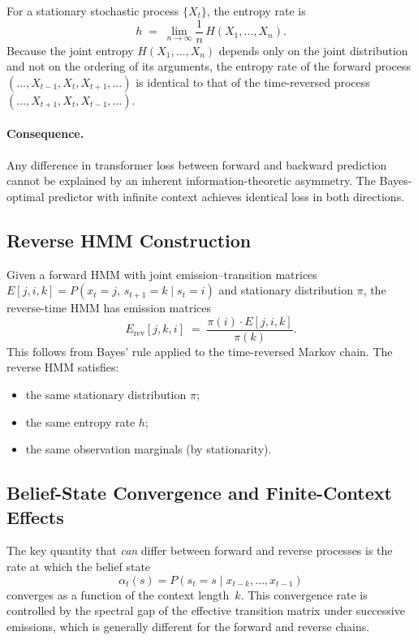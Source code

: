 \documentclass[11pt]{article}
\begin{document}
For a stationary stochastic process $\{X_t\}$, the entropy rate is
\begin{equation}
  h \;=\; \lim_{n \to \infty} \frac{1}{n}\, H(X_1, \ldots, X_n).
\end{equation}
Because the joint entropy $H(X_1, \ldots, X_n)$ depends only on the joint distribution and not on the ordering of its arguments, the entropy rate of the forward process $(\ldots, X_{t-1}, X_t, X_{t+1}, \ldots)$ is identical to that of the time-reversed process $(\ldots, X_{t+1}, X_t, X_{t-1}, \ldots)$.

\paragraph{Consequence.}
Any difference in transformer loss between forward and backward prediction cannot be explained by an inherent information-theoretic asymmetry.  The Bayes-optimal predictor with infinite context achieves identical loss in both directions.

\subsection{Reverse HMM Construction}

Given a forward HMM with joint emission--transition matrices $E[j, i, k] = P(x_t{=}j,\, s_{t+1}{=}k \mid s_t{=}i)$ and stationary distribution $\pi$, the reverse-time HMM has emission matrices
\begin{equation}\label{eq:rev-hmm}
  E_{\mathrm{rev}}[j, k, i]
  \;=\; \frac{\pi(i)\cdot E[j, i, k]}{\pi(k)}.
\end{equation}
This follows from Bayes' rule applied to the time-reversed Markov chain.  The reverse HMM satisfies:
\begin{itemize}
  \item the same stationary distribution $\pi$;
  \item the same entropy rate $h$;
  \item the same observation marginals (by stationarity).
\end{itemize}

\subsection{Belief-State Convergence and Finite-Context Effects}

The key quantity that \emph{can} differ between forward and reverse processes is the rate at which the belief state
\begin{equation}
  \alpha_t(s) = P(s_t{=}s \mid x_{t-k}, \ldots, x_{t-1})
\end{equation}
converges as a function of the context length~$k$.  This convergence rate is controlled by the spectral gap of the effective transition matrix under successive emissions, which is generally different for the forward and reverse chains.
\end{document}
